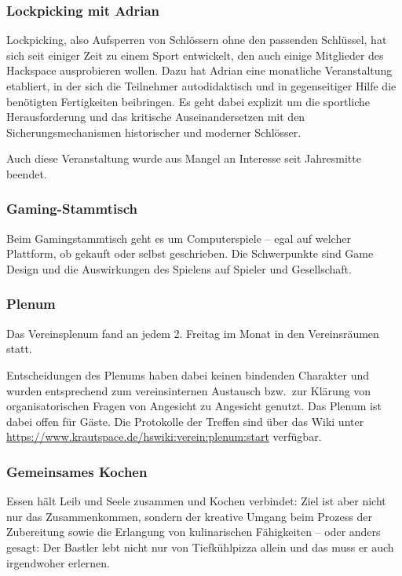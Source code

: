 \documentclass[ngerman]{scrartcl}
\begin{document}
\subsubsection{Lockpicking mit Adrian}

Lockpicking, also Aufsperren von Schlössern ohne den passenden
Schlüssel, hat sich seit einiger Zeit zu einem Sport entwickelt, den
auch einige Mitglieder des Hackspace ausprobieren wollen. Dazu hat
Adrian eine monatliche Veranstaltung etabliert, in der sich die Teilnehmer
autodidaktisch und in gegenseitiger Hilfe die benötigten Fertigkeiten
beibringen. Es geht dabei explizit um die sportliche Herausforderung
und das kritische Auseinandersetzen mit den Sicherungsmechanismen
historischer und moderner Schlösser.

Auch diese Veranstaltung wurde aus Mangel an Interesse seit Jahresmitte beendet. 

\subsubsection{Gaming-Stammtisch}

Beim Gamingstammtisch geht es um Computerspiele – egal auf welcher Plattform, ob gekauft oder selbst geschrieben.
Die Schwerpunkte sind Game Design und die Auswirkungen des Spielens auf Spieler und Gesellschaft. 

\subsubsection{Plenum}

Das Vereinsplenum fand an jedem 2. Freitag im Monat in den
Vereinsräumen statt.

Entscheidungen des Plenums haben dabei keinen bindenden Charakter und
wurden entsprechend zum vereinsinternen Austausch bzw.\ zur Klärung von
organisatorischen Fragen von Angesicht zu Angesicht genutzt. Das Plenum ist dabei offen für Gäste.
Die Protokolle der Treffen sind über das Wiki unter
\url{https://www.krautspace.de/hswiki:verein:plenum:start} verfügbar.

\subsubsection{Gemeinsames Kochen}

Essen hält Leib und Seele zusammen und Kochen verbindet:
Ziel ist aber nicht nur das Zusammenkommen, sondern der kreative Umgang
beim Prozess der Zubereitung sowie die Erlangung von kulinarischen
Fähigkeiten -- oder anders gesagt: Der Bastler lebt nicht nur von
Tiefkühlpizza allein und das muss er auch irgendwoher erlernen.
\end{document}
